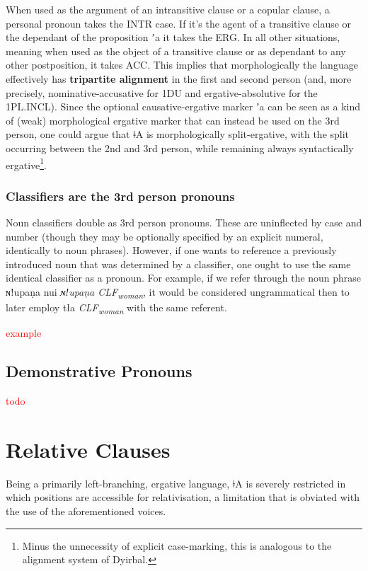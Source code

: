\documentclass[11pt,a5paper]{book}
\newcommand{\qcn}[1]{\textcolor{AccentText}{\large#1}}
\newcommand{\langname}{\qcn{ǂA}}
\newcommand{\transl}[2]{\qcn{#1} \emph{#2}}
\newcommand{\grammsc}[1]{\textsc{#1}}
\newcommand{\CLF}[1]{\grammsc{CLF}\textsubscript{#1}}
\newcommand{\ERG}{\grammsc{ERG}}
\newcommand{\ACC}{\grammsc{ACC}}
\newcommand{\INTR}{\grammsc{INTR}}
\newcommand{\cmnt}[1]{\textcolor{red}{#1}}
\begin{document}
When used as the argument of an intransitive clause or a copular clause, a personal pronoun takes the \INTR{} case. If it's the agent of a transitive clause or the dependant of the proposition \qcn{ʼa} it takes the \ERG{}. In all other situations, meaning when used as the object of a transitive clause or as dependant to any other postposition, it takes \ACC{}. This implies that morphologically the language effectively has \textbf{tripartite alignment} in the first and second person (and, more precisely, nominative-accusative for 1DU and ergative-absolutive for the 1PL.INCL). Since the optional causative-ergative marker \qcn{ʼa} can be seen as a kind of (weak) morphological ergative marker that can instead be used on the 3rd person, one could argue that \langname{} is morphologically split-ergative, with the split occurring between the 2nd and 3rd person, while remaining always syntactically ergative\footnote{Minus the unnecessity of explicit case-marking, this is analogous to the alignment system of Dyirbal.}.

\subsubsection{Classifiers are the 3rd person pronouns}

Noun classifiers double as 3rd person pronouns. These are uninflected by case and number (though they may be optionally specified by an explicit numeral, identically to noun phrases). However, if one wants to reference a previously introduced noun that was determined by a classifier, one ought to use the same identical classifier as a pronoun. For example, if we refer through the noun phrase \transl{ɴǃupaṇa nui}{ɴǃupaṇa \CLF{woman}}, it would be considered ungrammatical then to later employ \transl{tła}{\CLF{woman}} with the same referent.

\cmnt{example}

\subsection{Demonstrative Pronouns}

\cmnt{todo}

\section{Relative Clauses}\label{sec:relative}

Being a primarily left-branching, ergative language, \langname{} is severely restricted in which positions are accessible for relativisation, a limitation that is obviated with the use of the aforementioned voices.
\end{document}
